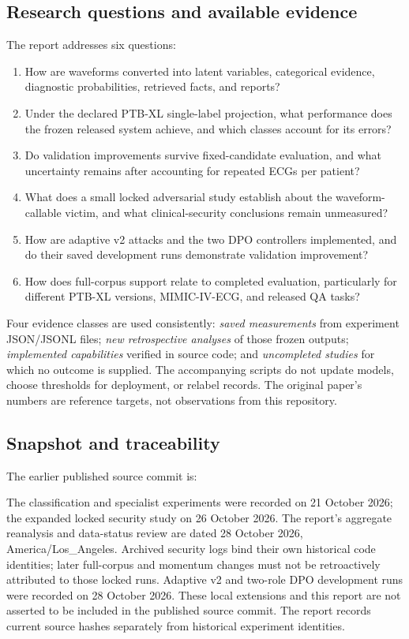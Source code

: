 \documentclass[11pt,a4paper]{article}
\newcommand{\code}[1]{\texttt{\detokenize{#1}}}
\begin{document}
\subsection{Research questions and available evidence}
The report addresses six questions:
\begin{enumerate}
\item How are waveforms converted into latent variables, categorical evidence, diagnostic probabilities, retrieved facts, and reports?
\item Under the declared PTB-XL single-label projection, what performance does the frozen released system achieve, and which classes account for its errors?
\item Do validation improvements survive fixed-candidate evaluation, and what uncertainty remains after accounting for repeated ECGs per patient?
\item What does a small locked adversarial study establish about the waveform-callable victim, and what clinical-security conclusions remain unmeasured?
\item How are adaptive v2 attacks and the two DPO controllers implemented, and do their saved development runs demonstrate validation improvement?
\item How does full-corpus support relate to completed evaluation, particularly for different PTB-XL versions, MIMIC-IV-ECG, and released QA tasks?
\end{enumerate}

Four evidence classes are used consistently: \emph{saved measurements} from experiment JSON/JSONL files; \emph{new retrospective analyses} of those frozen outputs; \emph{implemented capabilities} verified in source code; and \emph{uncompleted studies} for which no outcome is supplied. The accompanying scripts do not update models, choose thresholds for deployment, or relabel records. The original paper's numbers are reference targets, not observations from this repository.

\subsection{Snapshot and traceability}
The earlier published source commit is:\par
{\small\code{e98a5b0a2735f69a49c31e6fca2e624880376809}}\par
 The classification and specialist experiments were recorded on 21 October 2026; the expanded locked security study on 26 October 2026. The report's aggregate reanalysis and data-status review are dated 28 October 2026, America/Los\_Angeles. Archived security logs bind their own historical code identities; later full-corpus and momentum changes must not be retroactively attributed to those locked runs. Adaptive v2 and two-role DPO development runs were recorded on 28 October 2026. These local extensions and this report are not asserted to be included in the published source commit. The report records current source hashes separately from historical experiment identities.
\end{document}
